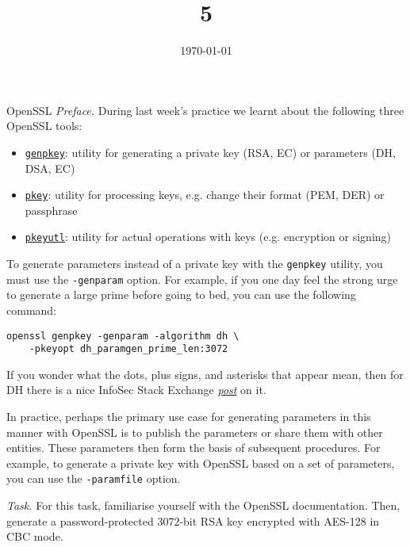 \documentclass{practice}
\title{5}
\date{\today}
\begin{document}
\maketitle

\begin{task}{OpenSSL}
  \textit{Preface.}
  During last week's practice we learnt about the following three OpenSSL tools:
  \begin{itemize}
    \item \href{https://docs.openssl.org/master/man1/openssl-genpkey/}{\texttt{genpkey}}: utility for generating a private key (RSA, EC) or parameters (DH, DSA, EC)
    \item \href{https://docs.openssl.org/master/man1/openssl-pkey/}{\texttt{pkey}}: utility for processing keys, e.g. change their format (PEM, DER) or passphrase
    \item \href{https://docs.openssl.org/master/man1/openssl-pkeyutl/}{\texttt{pkeyutl}}: utility for actual operations with keys (e.g. encryption or signing)
  \end{itemize}

  To generate parameters instead of a private key with the \texttt{genpkey} utility, you must use the \texttt{-genparam} option.
  For example, if you one day feel the strong urge to generate a large prime before going to bed, you can use the following command:
  \begin{Verbatim}
openssl genpkey -genparam -algorithm dh \
    -pkeyopt dh_paramgen_prime_len:3072
  \end{Verbatim}

  If you wonder what the dots, plus signs, and asterisks that appear mean, then for DH there is a nice InfoSec Stack Exchange \href{https://security.stackexchange.com/a/140639}{\textit{post}} on it.

  In practice, perhaps the primary use case for generating parameters in this manner with OpenSSL is to publish the parameters or share them with other entities.
  These parameters then form the basis of subsequent procedures.
  For example, to generate a private key with OpenSSL based on a set of parameters, you can use the \texttt{-paramfile} option.

  \textit{Task.}
  For this task, familiarise yourself with the OpenSSL documentation.
  Then, generate a password-protected $3072$-bit RSA key encrypted with AES-128 in CBC mode.
\end{task}
\end{document}
